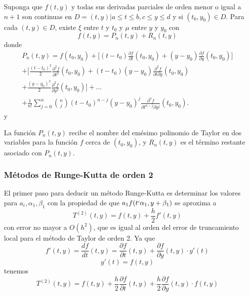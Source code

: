 \begin{theorem}
    Suponga que $f(t,y)$ y todas sus derivadas parciales de orden menor o igual a $n + 1$ son continuas en $D = {(t, y) | a \leq t \leq b, c \leq y \leq d}$ y si $(t_0, y_0) \in D$. Para cada $(t, y) \in D$, existe $\xi$ entre $t$ y $t_0$ y $\mu$ entre $y$ y $y_0$ con
    \[ f(t, y) = P_n(t, y) + R_n(t, y) \] 
    donde
    \begin{multline*}
        P_n(t,y) = f(t_0, y_0) + \bigg[ (t - t_0)\frac{\partial f}{\partial t}(t_0, y_0) + (y - y_0)\frac{\partial f}{\partial y}(t_0, y_0) \bigg] \\
        + \bigg[ \frac{(t - t_0)^2}{2} \frac{\partial^2 f}{\partial t^2}(t_0, y_0) + (t - t_0)(y - y_0) \frac{\partial^2 f}{\partial t \partial y}(t_0, y_0) \\
        + \frac{(y - y_0)^2}{2} \frac{\partial^2 f}{\partial y^2}(t_0, y_0) \bigg] + \dots \\
        + \frac{1}{n!} \sum_{j = 0}^{n} \binom{n}{j} (t - t_0)^{n - j} (y - y_0)^j \frac{\partial^n f}{\partial t^{n - j} \partial y^j}(t_0, y_0).
    \end{multline*}   
    y \par
\end{theorem}

La función $P_n(t, y)$ recibe el nombre del emésimo polinomio de Taylor en dos variables para la función $f$ cerca de $(t_0, y_0)$, y $R_n(t, y)$ es el término restante asociado con $P_n(t, y)$.

\subsubsection{Métodos de Runge-Kutta de orden 2}

El primer paso para deducir un método Runge-Kutta es determinar los valores para $a_i, \alpha_1, \beta_1$ con la propiedad de que $a_1 f(t `\alpha_1, y + \beta_1)$ se aproxima a 
\[ T^{(2)}(t, y) = f(t, y) + \frac{h}{2} f'(t, y) \]
con error no mayor a $O(h^2)$, que es igual al orden del error de truncamiento local para el método de Taylor de orden 2. Ya que 
\[ f'(t, y) = \frac{df}{dt}(t, y) = \frac{\partial f}{\partial t} (t, y) + \frac{\partial f}{\partial y} (t, y) \cdot y'(t)\]
\[ y'(t) = f(t, y)\]
tenemos
\begin{equation}
    \label{eq: Burden 5.18}
    T^{(2)}(t, y) = f(t, y) + \frac{h}{2} \frac{\partial f}{\partial t} (t, y) + \frac{h}{2} \frac{\partial f}{\partial y} (t, y) \cdot f(t, y)
\end{equation}

